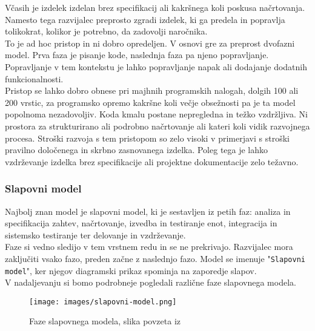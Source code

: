 \documentclass[a4paper,12pt,openright]{book}
\begin{document}
Včasih je izdelek izdelan brez specifikacij ali kakršnega koli poskusa načrtovanja. Namesto tega razvijalec preprosto zgradi izdelek, ki ga predela in popravlja tolikokrat, kolikor je potrebno, da zadovolji naročnika. \\
To je ad hoc pristop in ni dobro opredeljen. V osnovi gre za preprost dvofazni model. Prva faza je pisanje kode, naslednja faza pa njeno popravljanje. Popravljanje v tem kontekstu je lahko popravljanje napak ali dodajanje dodatnih funkcionalnosti. \\
Pristop se lahko dobro obnese pri majhnih programskih nalogah, dolgih 100 ali 200 vrstic, za programsko opremo kakršne koli večje obsežnosti pa je ta model popolnoma nezadovoljiv. Koda kmalu postane nepregledna in težko vzdržljiva. Ni prostora za strukturirano ali podrobno načrtovanje ali kateri koli vidik razvojnega procesa. Stroški razvoja s tem pristopom so zelo visoki v primerjavi s stroški pravilno določenega in skrbno zasnovanega izdelka. Poleg tega je lahko vzdrževanje izdelka brez specifikacije ali projektne dokumentacije zelo težavno. \cite{schach1996classical}
\subsubsection{Slapovni model}
Najbolj znan model je slapovni model, ki je sestavljen iz petih faz: analiza in specifikacija zahtev, načrtovanje, izvedba in testiranje enot, integracija in sistemsko testiranje ter delovanje in vzdrževanje. \\
Faze si vedno sledijo v tem vrstnem redu in se ne prekrivajo. Razvijalec mora zaključiti vsako fazo, preden začne z naslednjo fazo. Model se imenuje "\texttt{Slapovni model}", ker njegov diagramski prikaz spominja na zaporedje slapov. \cite{aggarwal2005software} \\
V nadaljevanju si bomo podrobneje pogledali različne faze slapovnega modela.

\begin{figure}[H]
    \centering
    \texttt{[image: images/slapovni-model.png]}
    \caption{Faze slapovnega modela, slika povzeta iz \cite{mercun2012}}
    \label{fig:enter-label}
\end{figure}
\end{document}
